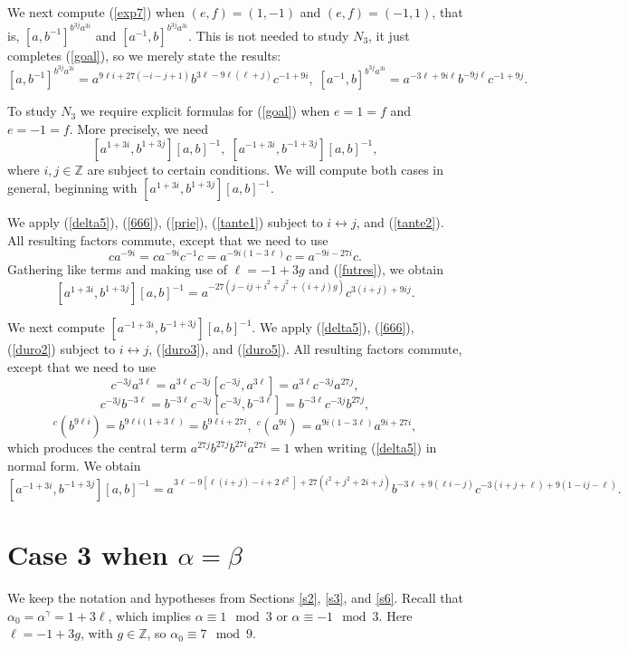 \documentclass{amsart}
\theoremstyle{definition}
\theoremstyle{remark}
\newcommand \Z{{\mathbb Z}}
\begin{document}
{We next compute  (\ref{exp7}) when $(e,f)=(1,-1)$ and $(e,f)=(-1,1)$, that is,
$[a,b^{-1}]^{b^{3j}a^{3i}}$ and $[a^{-1},b]^{b^{3j}a^{3i}}$. This is not needed to study $N_3$, it just completes (\ref{goal}),
so we merely state the results:
$$
[a,b^{-1}]^{b^{3j}a^{3i}}=a^{9\ell i+27(-i-j+1)}b^{3\ell-9\ell(\ell+j)}c^{-1+9i},\; 
[a^{-1},b]^{b^{3j}a^{3i}}=a^{-3\ell+9i\ell} b^{-9 j\ell} c^{-1+9j}.
$$


To study $N_3$ we require explicit formulas for (\ref{goal}) when $e=1=f$ and $e=-1=f$. More precisely, we need
$$
[a^{1+3i},b^{1+3j}][a,b]^{-1},\;  [a^{-1+3i},b^{-1+3j}][a,b]^{-1},
$$
where $i,j\in\Z$ are subject to certain conditions. We will compute both cases in general, beginning with 
$[a^{1+3i},b^{1+3j}][a,b]^{-1}$. 

We apply (\ref{delta5}), (\ref{666}), (\ref{prie}), (\ref{tante1}) subject to $i\leftrightarrow j$, 
and (\ref{tante2}). All resulting factors commute, except that we need to use
$$
c a^{-9i}=c a^{-9i} c^{-1}c=a^{-9i(1-3\ell)} c=a^{-9i-27i}c.
$$
Gathering like terms and making use of $\ell=-1+3g$ and (\ref{futres}), we obtain
\begin{equation}
\label{n3uno}
[a^{1+3i},b^{1+3j}][a,b]^{-1}=a^{-27(j-ij+i^2+j^2+(i+j)g)}c^{3(i+j)+9ij}.
\end{equation}

We next compute $[a^{-1+3i},b^{-1+3j}][a,b]^{-1}$. We apply (\ref{delta5}), (\ref{666}), (\ref{duro2})
subject to $i\leftrightarrow j$, (\ref{duro3}), 
and (\ref{duro5}). All  resulting factors commute, except that we need to use
$$
c^{-3j}a^{3\ell}=a^{3\ell}c^{-3j}[c^{-3j},a^{3\ell}]=a^{3\ell}c^{-3j}a^{27j},
$$
$$
c^{-3j}b^{-3\ell}=b^{-3\ell}c^{-3j}[c^{-3j},b^{-3\ell}]=b^{-3\ell}c^{-3j}b^{27j},
$$
$$
{}^c (b^{9\ell i})=b^{9\ell i(1+3\ell)}=b^{9\ell i+27i},\; {}^c (a^{9i})=a^{9i(1-3\ell)}a^{9 i+27i},
$$
which produces the central term $a^{27j}b^{27j}b^{27i}a^{27i}=1$ when writing (\ref{delta5}) in normal form. We obtain
\begin{equation}
\label{n3dos}
[a^{-1+3i},b^{-1+3j}][a,b]^{-1}=a^{3\ell-9[\ell(i+j)-i+2\ell^2]+27(i^2+j^2+2i+j)}
b^{-3\ell+9(\ell i-j)}c^{-3(i+j+\ell)+9(1-ij-\ell)}.
\end{equation}

\section{Case 3 when $\alpha=\beta$}\label{s7}

We keep the notation and hypotheses from Sections \ref{s2}, \ref{s3}, and \ref{s6}. 
Recall that $\alpha_0=\alpha^\gamma=1+3\ell$, which implies $\alpha\equiv 1\mod 3$ or $\alpha\equiv -1\mod 3$.
Here $\ell=-1+3g$, with $g\in\Z$, so $\alpha_0\equiv 7\mod 9$.

}
\end{document}
